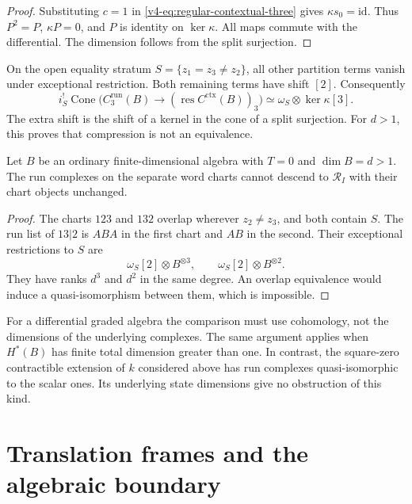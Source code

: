 \begin{proof}
Substituting \(c=1\) in
\eqref{v4-eq:regular-contextual-three} gives
\(\kappa s_0=\mathrm{id}\).
Thus \(P^2=P\), \(\kappa P=0\), and \(P\) is
identity on \(\ker\kappa\).
All maps commute with the differential.
The dimension follows from the split surjection.
\end{proof}

On the open equality stratum
\(S=\{z_1=z_3\ne z_2\}\), all other partition terms
vanish under exceptional restriction. Both remaining
terms have shift \([2]\). Consequently
\[
 i_S^!\operatorname{Cone}
 \bigl(C_3^{\mathrm{run}}(B)\to
       (\operatorname{res}C^{\mathrm{ctx}}(B))_3\bigr)
       \simeq\omega_S\otimes\ker\kappa[3].
\]
The extra shift is the shift of a kernel in the
cone of a split surjection. For \(d>1\), this
proves that compression is not an equivalence.

\begin{proposition}
\label{v4-prop:regular-unchanged-descent}
Let \(B\) be an ordinary finite-dimensional
algebra with \(T=0\) and \(\dim B=d>1\).
The run complexes on the separate word charts
cannot descend to \(\mathscr R_I\) with their
chart objects unchanged.
\end{proposition}

\begin{proof}
The charts \(123\) and \(132\) overlap wherever
\(z_2\ne z_3\), and both contain \(S\).
The run list of \(13|2\) is \(ABA\) in the
first chart and \(AB\) in the second.
Their exceptional restrictions to \(S\) are
\[
 \omega_S[2]\otimes B^{\otimes3},
 \qquad
 \omega_S[2]\otimes B^{\otimes2}.
\]
They have ranks \(d^3\) and \(d^2\) in the
same degree. An overlap equivalence would
induce a quasi-isomorphism between them,
which is impossible.
\end{proof}

For a differential graded algebra the comparison
must use cohomology, not the dimensions of the
underlying complexes. The same argument applies
when \(H^*(B)\) has finite total dimension
greater than one. In contrast, the square-zero
contractible extension of \(k\) considered above
has run complexes quasi-isomorphic to the scalar
ones. Its underlying state dimensions give no
obstruction of this kind.

\section{Translation frames and the algebraic boundary}
\label{v4-sec:regular-translation}

